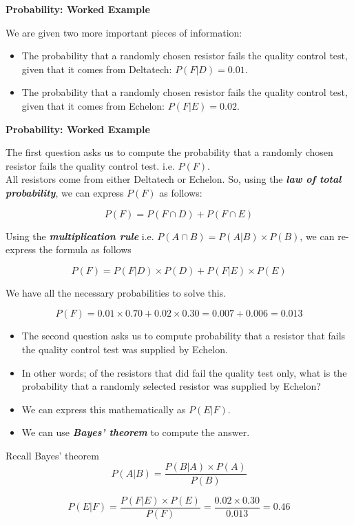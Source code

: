 {
	\noindent \textbf{Probability: Worked Example}
	
	We are given two more important pieces of information:
	\begin{itemize}
		\item The probability that a randomly chosen resistor fails the quality control test, given that it comes from Deltatech: $P(F|D) = 0.01 $.
		\item The probability that a randomly chosen resistor fails the quality control test, given that it comes from Echelon: $P(F|E) = 0.02$.
	\end{itemize}
	
	
	\noindent \textbf{Probability: Worked Example}
	
	The first question asks us to compute the probability that a randomly chosen resistor fails the quality control test. i.e. $P(F)$.\\
	\bigskip
	All resistors come from either Deltatech or Echelon. So, using the \textbf{\emph{law of total probability}}, we can express $P(F)$ as follows:
	
	\[ P(F)  = P(F \cap D) + P(F \cap E) \]
	
	
	
	Using the \textbf{\emph{multiplication rule}}  i.e. $P(A \cap B) = P(A|B) \times P(B)$, we can re-express the formula as follows
	
	\[ P(F)  = P(F|D) \times P(D) + P(F|E) \times P(E) \]
	
	We have all the necessary probabilities to solve this.
	
	\[ P(F)  = 0.01 \times 0.70 + 0.02 \times 0.30   = 0.007 + 0.006  = 0.013\]
	
	
	
	\begin{itemize}
		\item
		The second question asks us to compute probability that a resistor that fails the quality control test was supplied by Echelon.
		\item In other words; of the resistors that did fail the quality test only, what is the probability that a randomly selected resistor was supplied by Echelon?
		\item We can express this mathematically as $P(E|F)$.
		\item We can use \textbf{\emph{Bayes' theorem}} to compute the answer.
	\end{itemize}
	
	
	Recall Bayes' theorem
	\[ P(A|B) = \frac{P(B|A)\times P(A)}{P(B)} \]
	\bigskip
	
	\[ P(E|F) = \frac{P(F|E)\times P(E)}{P(F)}  =  \frac{0.02 \times 0.30}{0.013} = 0.46\]
	
}
